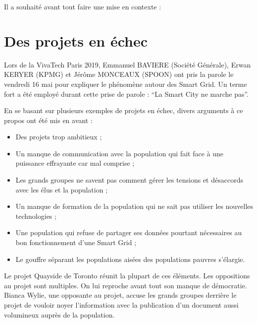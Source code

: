 Il a souhaité avant tout faire une mise en contexte :



\section{Des projets en échec}

Lors de la VivaTech Paris 2019, Emmanuel BAVIERE (Société Générale), Erwan KERYER (KPMG)
et Jérôme MONCEAUX (SPOON) ont pris la parole le vendredi 16 mai pour expliquer le phénomène autour des
Smart Grid. Un terme fort a été employé durant cette prise de parole :
``La Smart City ne marche pas''.

En se basant sur plusieurs exemples de projets en échec, divers arguments à ce propos ont été mis en
avant :
\begin{itemize}
    \item Des projets trop ambitieux ;
    \item Un manque de communication avec la population qui fait face à une puissance effrayante car mal comprise ;
    \item Les grands groupes ne savent pas comment gérer les tensions et désaccords avec les élus et la population ;
    \item Un manque de formation de la population qui ne sait pas utiliser les nouvelles technologies ;
    \item Une population qui refuse de partager ses données pourtant nécessaires au bon fonctionnement d’une Smart Grid ;
    \item Le gouffre séparant les populations aisées des populations pauvres s'élargie.
\end{itemize}

Le projet Quayside de Toronto réunit la plupart de ces éléments.
Les oppositions au projet sont multiples. On lui reproche avant tout son manque de démocratie.
Bianca Wylie, une opposante au projet, accuse les grands groupes derrière le projet de vouloir noyer l'information
avec la publication d'un document aussi volumineux auprès de la population.